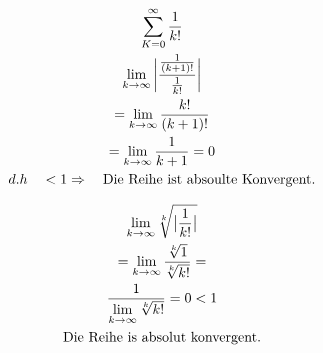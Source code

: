 \begin{example}[QK]
	    \begin{gather*}
	    	\sum_{K=0}^{\infty} \dfrac{1}{k!}\\
	 	   \lim\limits_{k \rightarrow \infty} {\bigg|\frac{\frac{1}{(k+1)!}}{\frac{1}{k!}}\bigg|}  \\
	 	   = \lim\limits_{k \rightarrow \infty} \frac{k!}{(k+1)!} \\
													   	   =\lim\limits_{k \rightarrow \infty} \frac{1}{k+1} = 0   \\
													   	  d.h \quad <1 \Rightarrow \quad \text{Die Reihe ist absoulte Konvergent.}  
		    \end{gather*}     
	
\end{example}
\begin{example}[WK]
	\begin{gather*}
	\lim\limits_{k \rightarrow \infty} \sqrt[k]{\big|\frac{1}{k!}\big|} \\
=\lim\limits_{k \rightarrow \infty} \frac{\sqrt[k]{1}}{\sqrt[k]{k!}}
=\\
	\frac{1}{\lim\limits_{k \rightarrow \infty} \sqrt[k]{k!}}=0 <1 \\
	\text{Die Reihe is absolut konvergent.}
	\end{gather*}	 
	     
	
\end{example}



 